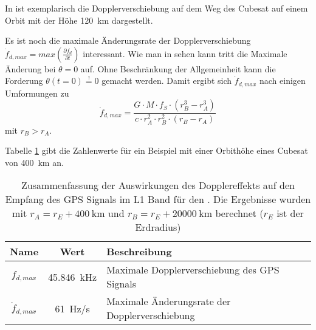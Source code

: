 
In  ist exemplarisch die Dopplerverschiebung auf dem Weg des Cubesat auf einem Orbit mit der Höhe \SI{120}{\km} dargestellt. 


Es ist noch die maximale Änderungsrate der Dopplerverschiebung  $\dot f_{d,max}=max\left(\frac{\partial f_d}{\partial t}\right)$ interessant.  Wie man in  sehen kann tritt die Maximale Änderung bei $\theta=0$ auf. Ohne Beschränkung der Allgemeinheit kann die Forderung $\theta(t=0)\overset{!}{=}0$ gemacht werden. Damit ergibt sich $\dot f_{d,max}$ nach einigen Umformungen zu
\begin{equation}
	\dot f_{d,max}= \frac{G \cdot  M \cdot  f_S \cdot  (r_B^3-r_A^3)}{c \cdot  r_A^2 \cdot  r_B^2\cdot  (r_B-r_A)}
\end{equation}
mit $r_B>r_A$.

Tabelle \ref{TabDoppler} gibt die Zahlenwerte für ein Beispiel mit einer Orbithöhe eines Cubesat von \SI{400}{km} an.

\begin{table}[htbp]
    \ttabbox
    {
        \caption[Dopplereffekt für GPS Signal im \dscubesat]{Zusammenfassung der Auswirkungen des Dopplereffekts auf den Empfang des GPS Signals im L1 Band für den \dscubesat. Die Ergebnisse wurden mit $r_A=r_E+\SI{400}{\km}$ und $r_B=r_E+\SI{20000}{\km}$ berechnet ($r_E$ ist der Erdradius)}
        \label{TabDoppler}
    }
    {
    \begin{tabular}{c c p{5.5cm}}
        \toprule
        Name             & Wert & Beschreibung \\
        \midrule
        $f_{d,max}$ & \SI{45.846}{\kHz} &  Maximale Dopplerverschiebung des GPS Signals\\
        $\dot f_{d,max}$ & \SI{61}{\Hz/\s}& Maximale Änderungsrate der Dopplerverschiebung \\
        \bottomrule
    \end{tabular}
}
\end{table}
